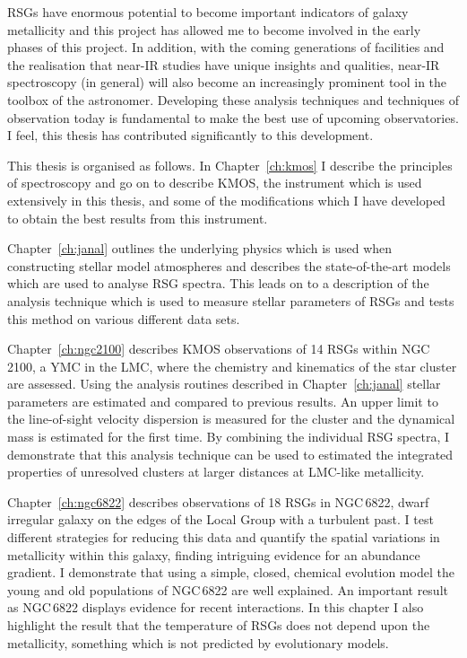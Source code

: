 {RSGs have enormous potential to become important indicators of galaxy metallicity and this project has allowed me to become involved in the early phases of this project.
In addition, with the coming generations of facilities and the realisation that near-IR studies have unique insights and qualities, near-IR spectroscopy (in general) will also become an increasingly prominent tool in the toolbox of the astronomer.
Developing these analysis techniques and techniques of observation today is fundamental to make the best use of upcoming observatories.
I feel, this thesis has contributed significantly to this development.

This thesis is organised as follows.
In Chapter~\ref{ch:kmos} I describe the principles of spectroscopy and go on to describe KMOS, the instrument which is used extensively in this thesis, and some of the modifications which I have developed to obtain the best results from this instrument.

Chapter~\ref{ch:janal} outlines the underlying physics which is used when constructing stellar model atmospheres and describes the state-of-the-art models which are used to analyse RSG spectra.
This leads on to a description of the analysis technique which is used to measure stellar parameters of RSGs and tests this method on various different data sets.

Chapter~\ref{ch:ngc2100} describes KMOS observations of 14 RSGs within NGC\,2100, a YMC in the LMC, where the chemistry and kinematics of the star cluster are assessed.
Using the analysis routines described in Chapter~\ref{ch:janal} stellar parameters are estimated and compared to previous results. An upper limit to the line-of-sight velocity dispersion is measured for the cluster and the dynamical mass is estimated for the first time.
By combining the individual RSG spectra, I demonstrate that this analysis technique can be used to estimated the integrated properties of unresolved clusters at larger distances at LMC-like metallicity.

Chapter~\ref{ch:ngc6822} describes observations of 18 RSGs in NGC\,6822, dwarf irregular galaxy on the edges of the Local Group with a turbulent past.
I test different strategies for reducing this data and quantify the spatial variations in metallicity within this galaxy, finding intriguing evidence for an abundance gradient.
I demonstrate that using a simple, closed, chemical evolution model the young and old populations of NGC\,6822 are well explained. An important result as NGC\,6822 displays evidence for recent interactions.
In this chapter I also highlight the result that the temperature of RSGs does not depend upon the metallicity, something which is not predicted by evolutionary models.

}
